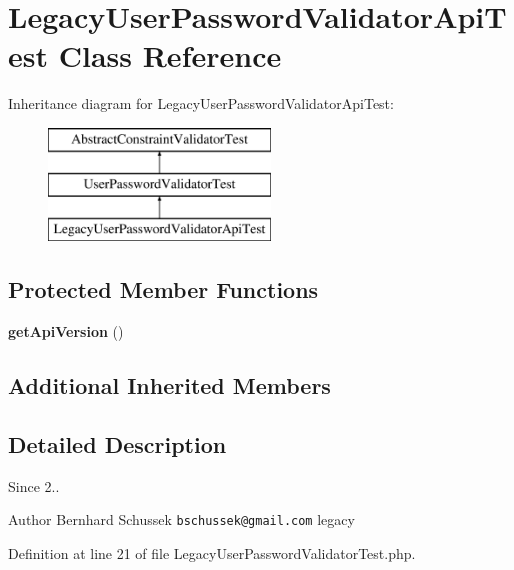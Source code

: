 \section{Legacy\+User\+Password\+Validator\+Api\+Test Class Reference}
\label{class_symfony_1_1_component_1_1_security_1_1_core_1_1_tests_1_1_validator_1_1_constraints_1_1_le2ed3c51aa70cef7c3c3c13377d4966cd}
Inheritance diagram for Legacy\+User\+Password\+Validator\+Api\+Test\+:\begin{figure}[H]
\begin{center}
\leavevmode
\includegraphics[height=3.000000cm]{class_symfony_1_1_component_1_1_security_1_1_core_1_1_tests_1_1_validator_1_1_constraints_1_1_le2ed3c51aa70cef7c3c3c13377d4966cd}
\end{center}
\end{figure}
\subsection*{Protected Member Functions}
\begin{DoxyCompactItemize}
\item 
{\bf get\+Api\+Version} ()
\end{DoxyCompactItemize}
\subsection*{Additional Inherited Members}


\subsection{Detailed Description}
\begin{DoxySince}{Since}
2.. 
\end{DoxySince}
\begin{DoxyAuthor}{Author}
Bernhard Schussek {\tt bschussek@gmail.\+com}  legacy 
\end{DoxyAuthor}


Definition at line 21 of file Legacy\+User\+Password\+Validator\+Test.\+php.




